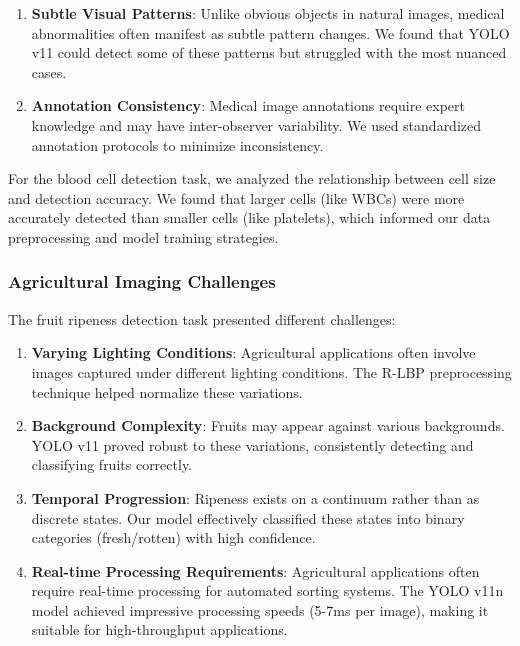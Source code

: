 \begin{multicols}{2}
\begin{enumerate}
    \item \textbf{Subtle Visual Patterns}: Unlike obvious objects in natural images, medical abnormalities often manifest as subtle pattern changes. We found that YOLO v11 could detect some of these patterns but struggled with the most nuanced cases.
    
    \item \textbf{Annotation Consistency}: Medical image annotations require expert knowledge and may have inter-observer variability. We used standardized annotation protocols to minimize inconsistency.
\end{enumerate}

For the blood cell detection task, we analyzed the relationship between cell size and detection accuracy. We found that larger cells (like WBCs) were more accurately detected than smaller cells (like platelets), which informed our data preprocessing and model training strategies.

\subsubsection{Agricultural Imaging Challenges}

The fruit ripeness detection task presented different challenges:

\begin{enumerate}
    \item \textbf{Varying Lighting Conditions}: Agricultural applications often involve images captured under different lighting conditions. The R-LBP preprocessing technique helped normalize these variations.
    
    \item \textbf{Background Complexity}: Fruits may appear against various backgrounds. YOLO v11 proved robust to these variations, consistently detecting and classifying fruits correctly.
    
    \item \textbf{Temporal Progression}: Ripeness exists on a continuum rather than as discrete states. Our model effectively classified these states into binary categories (fresh/rotten) with high confidence.
    
    \item \textbf{Real-time Processing Requirements}: Agricultural applications often require real-time processing for automated sorting systems. The YOLO v11n model achieved impressive processing speeds (5-7ms per image), making it suitable for high-throughput applications.
\end{enumerate}


\end{multicols}
